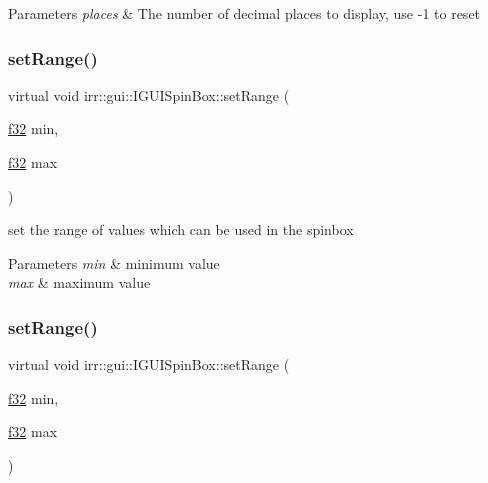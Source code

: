 \begin{DoxyParams}{Parameters}
{\em places} & The number of decimal places to display, use -\/1 to reset \\
\hline
\end{DoxyParams}
\mbox{\label{classirr_1_1gui_1_1IGUISpinBox_af7bc07a7be30d16a6ff27750782aaa80}} 
\subsubsection{\texorpdfstring{set\+Range()}{setRange()}\hspace{0.1cm}{\footnotesize\ttfamily [1/2]}}
{\footnotesize\ttfamily virtual void irr\+::gui\+::\+I\+G\+U\+I\+Spin\+Box\+::set\+Range (\begin{DoxyParamCaption}\item[{\hyperlink{namespaceirr_a0277be98d67dc26ff93b1a6a1d086b07}{f32}}]{min,  }\item[{\hyperlink{namespaceirr_a0277be98d67dc26ff93b1a6a1d086b07}{f32}}]{max }\end{DoxyParamCaption})\hspace{0.3cm}{\ttfamily [pure virtual]}}



set the range of values which can be used in the spinbox 


\begin{DoxyParams}{Parameters}
{\em min} & minimum value \\
\hline
{\em max} & maximum value \\
\hline
\end{DoxyParams}
\mbox{\label{classirr_1_1gui_1_1IGUISpinBox_af7bc07a7be30d16a6ff27750782aaa80}} 
\subsubsection{\texorpdfstring{set\+Range()}{setRange()}\hspace{0.1cm}{\footnotesize\ttfamily [2/2]}}
{\footnotesize\ttfamily virtual void irr\+::gui\+::\+I\+G\+U\+I\+Spin\+Box\+::set\+Range (\begin{DoxyParamCaption}\item[{\hyperlink{namespaceirr_a0277be98d67dc26ff93b1a6a1d086b07}{f32}}]{min,  }\item[{\hyperlink{namespaceirr_a0277be98d67dc26ff93b1a6a1d086b07}{f32}}]{max }\end{DoxyParamCaption})\hspace{0.3cm}{\ttfamily [pure virtual]}}



